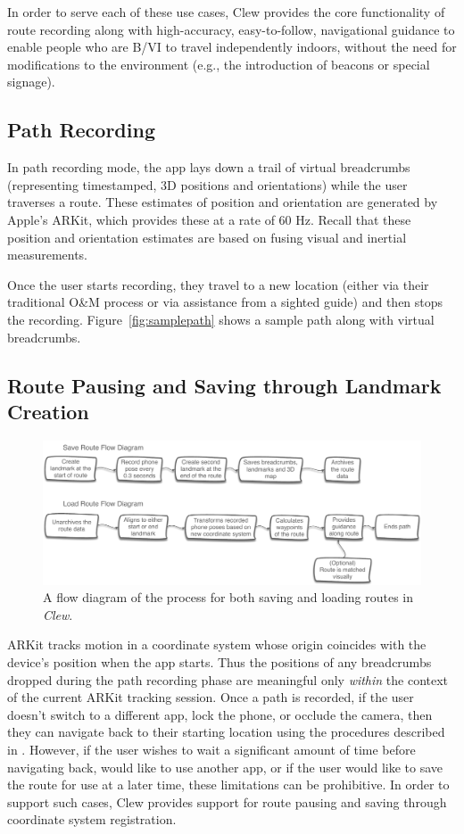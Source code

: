 \documentclass[chi]{sigchi}
\newcommand{\BVI}{B/VI\xspace}
\newcommand{\OM}{O\&M\xspace}
\begin{document}
In order to serve each of these use cases, Clew provides the core functionality of route recording along with high-accuracy, easy-to-follow, navigational guidance to enable people who are \BVI to travel independently indoors, without the need for modifications to the environment (e.g., the introduction of beacons or special signage).

\subsection{Path Recording}

In path recording mode, the app lays down a trail of virtual breadcrumbs (representing timestamped, 3D positions and orientations) while the user traverses a route.  These estimates of position and orientation are generated by Apple's ARKit, which provides these at a rate of 60 Hz.  Recall that these position and orientation estimates are based on fusing visual and inertial measurements. %

Once the user starts recording, they travel to a new location (either via their traditional \OM process or via assistance from a sighted guide) and then stops the recording.  Figure~\ref{fig:samplepath} shows a sample path along with virtual breadcrumbs.
%
\subsection{Route Pausing and Saving through Landmark Creation}
\begin{figure}
\begin{center}
\includegraphics[width=.7\linewidth]{Figures/FlowDiagram}
\end{center}
\caption{A flow diagram of the process for both saving and loading routes in \emph{Clew}.\label{fig:flow}}
\end{figure}
ARKit tracks motion in a coordinate system whose origin coincides with the device's position when the app starts.  Thus the positions of any breadcrumbs dropped during the path recording phase are meaningful only \emph{within} the context of the current ARKit tracking session.  Once a path is recorded, if the user doesn't switch to a different app, lock the phone, or occlude the camera, then they can navigate back to their starting location using the procedures described in \emph{}.  However, if the user wishes to wait a significant amount of time before navigating back, would like to use another app, or if the user would like to save the route for use at a later time, these limitations can be prohibitive.  In order to support such cases, Clew provides support for route pausing and saving through coordinate system registration.
\end{document}
